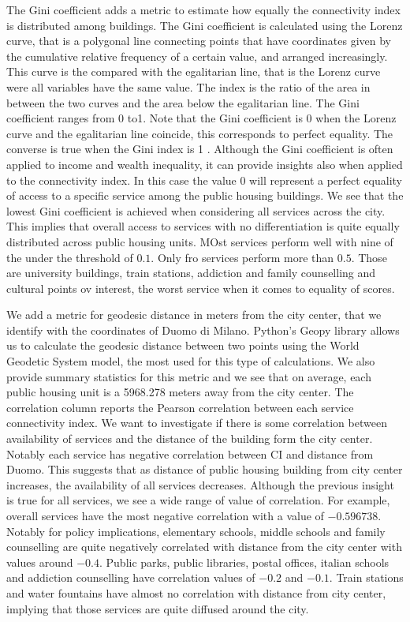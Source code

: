 \documentclass[11pt, titlepage]{article}
\begin{document}
The Gini coefficient adds a metric to estimate how equally the connectivity index is distributed among buildings. The Gini coefficient is calculated using the Lorenz curve, that is  a polygonal line connecting points that have coordinates given by the cumulative relative frequency of a certain value, and arranged increasingly. This curve is the compared with the egalitarian line, that is the Lorenz curve were all variables have the same value. The index is the ratio of the area in between the two curves and the area below the egalitarian line. The Gini coefficient ranges from 0 to1. Note that the Gini coefficient is 0 when the Lorenz curve and the egalitarian line coincide, this corresponds to perfect equality. The converse is true when the Gini index is 1 \parencite{giorgi_gini_2020}. Although the Gini coefficient is often applied to income and wealth inequality, it can provide insights also when applied to the connectivity index. In this case the value 0 will represent a perfect equality of access to a specific service among the public housing buildings. We see that the lowest Gini coefficient is achieved when considering all services across the city. This implies that overall access to services with no differentiation is quite equally distributed across public housing units. MOst services perform well with nine of the under the threshold of $0.1$. Only fro services perform more than $0.5$. Those are university buildings, train stations, addiction and family counselling and cultural points ov interest, the worst service when it comes to equality of scores. 

We add a metric for geodesic distance in meters from the city center, that we identify with the coordinates of Duomo di Milano. Python's Geopy library allows us to calculate the geodesic distance between two points using the World Geodetic System model, the most used for this type of calculations. We also provide summary statistics for this metric and we see that on average, each public housing unit is a 5968.278 meters away from the city center. The correlation column reports the Pearson correlation between each service connectivity index. We want to investigate if there is some correlation between availability of services and the distance of the building form the city center. Notably each service has negative correlation between CI and distance from Duomo. This suggests that as distance of public housing building from city center increases, the availability of all services decreases. Although the previous insight is true for all services, we see a wide range of value of correlation. For example, overall services have the most negative correlation with a value of $-0.596738$. Notably for policy implications, elementary schools, middle schools and family counselling are quite negatively correlated with distance from the city center with values around $-0.4$. Public parks, public libraries, postal offices, italian schools
and addiction counselling have correlation values of $-0.2$ and $-0.1$. Train stations and water fountains have almost no correlation with distance from city center, implying that those services are quite diffused around the city. 
\end{document}
